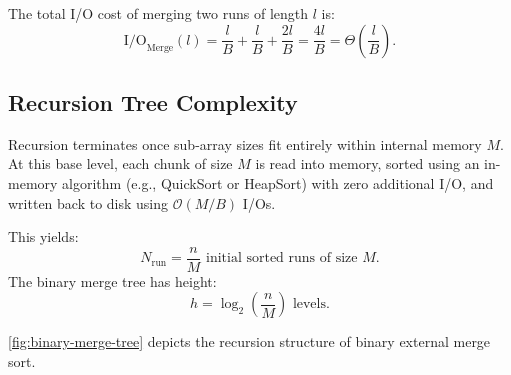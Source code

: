 The total I/O cost of merging two runs of length $l$ is:
\begin{equation}
  \mathrm{I/O}_{\text{Merge}}(l) = \frac{l}{B} + \frac{l}{B} + \frac{2l}{B} = \frac{4l}{B} = \Theta\left(\frac{l}{B}\right).
\end{equation}

\subsection{Recursion Tree Complexity}
\label{subsec:recursion-tree}

Recursion terminates once sub-array sizes fit entirely within internal memory $M$. At this base level, each chunk of size $M$ is read into memory, sorted using an in-memory algorithm (e.g., QuickSort or HeapSort) with zero additional I/O, and written back to disk using $\mathcal{O}(M/B)$ I/Os.

This yields:
\[
  N_{\mathrm{run}} = \frac{n}{M} \text{ initial sorted runs of size } M.
\]
The binary merge tree has height:
\begin{equation}
  h = \log_2\left(\frac{n}{M}\right) \text{ levels}.
\end{equation}

\autoref{fig:binary-merge-tree} depicts the recursion structure of binary external merge sort.


